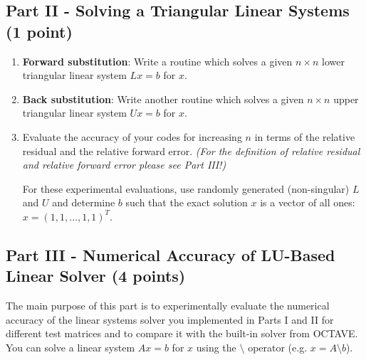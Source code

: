 \documentclass{scrartcl}
\begin{document}
    \subsection*{Part II - Solving a Triangular Linear Systems (1 point)}
        \begin{enumerate}
            \item \textbf{Forward substitution}: Write a routine which solves a given $n \times n$ lower triangular linear system $Lx = b$ for $x$.
            \item \textbf{Back substitution}: Write another routine which solves a given $n \times n$ upper triangular linear system $Ux = b$ for $x$.
            \item Evaluate the accuracy of your codes for increasing $n$ in terms of the relative residual and the relative forward error. \emph{(For the definition of relative residual and relative forward error please see Part III!)}
            
            For these experimental evaluations, use randomly generated (non-singular) $L$ and $U$ and determine $b$ such that the exact solution $x$ is a vector of all ones: $x = (1, 1, \dots, 1, 1)^{T}$.  
        \end{enumerate}

    \subsection*{Part III - Numerical Accuracy of LU-Based Linear Solver (4 points)}
    The main purpose of this part is to experimentally evaluate the numerical accuracy of the linear systems solver you implemented in Parts I and II for different test matrices and to compare it with the built-in solver from OCTAVE. 
    You can solve a linear system $Ax=b$ for $x$ using the $\setminus$ operator (e.g. $x = A \setminus b$).
 
\end{document}
